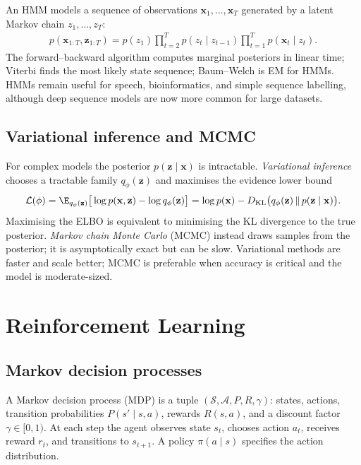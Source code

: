 \documentclass[a4paper, 12pt]{book}
\begin{document}
An HMM models a sequence of observations $\mathbf{x}_1,\ldots,\mathbf{x}_T$ generated
by a latent Markov chain $z_1,\ldots,z_T$:
\begin{align}
    p(\mathbf{x}_{1:T},\mathbf{z}_{1:T})
    = p(z_1)\prod_{t=2}^T p(z_t\mid z_{t-1})
      \prod_{t=1}^T p(\mathbf{x}_t\mid z_t).
\end{align}
The forward--backward algorithm computes marginal posteriors in linear time; Viterbi
finds the most likely state sequence; Baum--Welch is EM for HMMs. HMMs remain useful
for speech, bioinformatics, and simple sequence labelling, although deep sequence
models are now more common for large datasets.

\section{Variational inference and MCMC}

For complex models the posterior $p(\mathbf{z}\mid\mathbf{x})$ is intractable.
\emph{Variational inference} chooses a tractable family $q_\phi(\mathbf{z})$ and
maximises the evidence lower bound
\begin{align}
    \mathcal{L}(\phi)
    = \E_{q_\phi(\mathbf{z})}\big[\log p(\mathbf{x},\mathbf{z})
      - \log q_\phi(\mathbf{z})\big]
    = \log p(\mathbf{x}) - D_{\mathrm{KL}}\big(q_\phi(\mathbf{z})\,\|\,
      p(\mathbf{z}\mid\mathbf{x})\big).
\end{align}
Maximising the ELBO is equivalent to minimising the KL divergence to the true
posterior. \emph{Markov chain Monte Carlo} (MCMC) instead draws samples from the
posterior; it is asymptotically exact but can be slow. Variational methods are faster
and scale better; MCMC is preferable when accuracy is critical and the model is
moderate-sized.


\chapter{Reinforcement Learning}
\label{ch:rl}

\section{Markov decision processes}

A Markov decision process (MDP) is a tuple
$(\mathcal{S},\mathcal{A},P,R,\gamma)$: states, actions, transition probabilities
$P(s'\mid s,a)$, rewards $R(s,a)$, and a discount factor $\gamma \in [0,1)$. At each
step the agent observes state $s_t$, chooses action $a_t$, receives reward $r_t$, and
transitions to $s_{t+1}$. A policy $\pi(a\mid s)$ specifies the action distribution.
\end{document}
